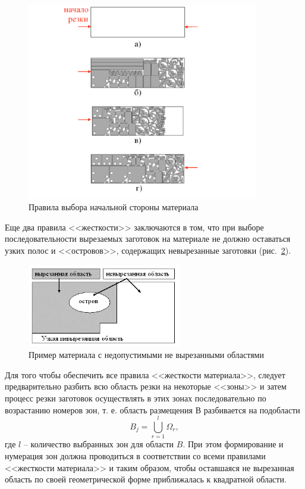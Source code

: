\documentclass[11pt,twoside,openany]{report}
\begin{document}
\begin{figure}
  \begin{center}
  \includegraphics[width=0.9\textwidth]{list-hardness.png}
  \caption{Правила выбора начальной стороны материала }
  \label{list-hardness}
  \end{center}
\end{figure}

Еще два правила <<жесткости>> заключаются в том,
что при выборе последовательности вырезаемых заготовок
на материале не должно оставаться узких полос и <<островов>>,
содержащих невырезанные заготовки
(рис.~\ref{island}).

\begin{figure}[h]
  \begin{center}
  \includegraphics[width=0.6\textwidth]{island.png}
  \caption{Пример материала с недопустимыми не вырезанными областями}
  \label{island}
  \end{center}
\end{figure}

Для того чтобы обеспечить все правила <<жесткости материала>>,
следует предварительно разбить всю область резки на некоторые <<зоны>>
и затем процесс резки заготовок осуществлять
в этих зонах последовательно по возрастанию номеров зон,
т. е. область размещения $В$ разбивается на подобласти
\begin{equation}
  B_j = \bigcup_{r=1}^l \Omega_r
  ,
\end{equation}
где $l$
-- количество выбранных зон для области $B$.
При этом формирование и нумерация зон
должна проводиться в соответствии со всеми правилами
<<жесткости материала>> и таким образом,
чтобы оставшаяся не вырезанная область
по своей геометрической форме приближалась к квадратной области.
\end{document}
